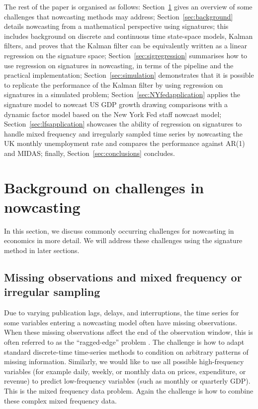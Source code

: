 \documentclass[a4paper, 12pt]{article}
\theoremstyle{remark}
\begin{document}
The rest of the paper is organised as follows: Section~\ref{sec:nowcasting_challenges} gives an overview of some challenges that nowcasting methods may address; Section~\ref{sec:background} details nowcasting from a mathematical perspective using signatures; this includes background on discrete and continuous time state-space models, Kalman filters, and proves that the Kalman filter can be equivalently written as a linear regression on the signature space; Section~\ref{sec:sigregression} summarises how to use regression on signatures in nowcasting, in terms of the pipeline and the practical implementation; Section~\ref{sec:simulation} demonstrates that it is possible to replicate the performance of the Kalman filter by using regression on signatures in a simulated problem; Section~\ref{sec:NYfedapplication} applies the signature model to nowcast US GDP growth drawing comparisons with a dynamic factor model based on the New York Fed staff nowcast model; Section~\ref{sec:lfsapplication} showcases the ability of regression on signatures to handle mixed frequency and irregularly sampled time series by nowcasting the UK monthly unemployment rate and compares the performance against AR(1) and MIDAS; finally, Section~\ref{sec:conclusions} concludes.  
\section{Background on challenges in nowcasting} \label{sec:nowcasting_challenges}

In this section, we discuss commonly occurring challenges for nowcasting in economics in more detail. We will address these challenges using the signature method in later sections.

\subsection{Missing observations and mixed frequency or irregular sampling} \label{subsec:irregular}
Due to varying publication lags, delays, and interruptions, the time series for some variables entering a nowcasting model often have missing observations. When these missing observations affect the end of the observation window, this is often referred to as the ``ragged-edge'' problem \citep{wallis1986forecasting}. The challenge is how to adapt standard discrete-time time-series methods to condition on arbitrary patterns of missing information. Similarly, we would like to use all possible high-frequency variables (for example daily, weekly, or monthly data on prices, expenditure, or revenue) to predict low-frequency variables (such as monthly or quarterly GDP). This is the mixed frequency data problem. Again the challenge is how to combine these complex mixed frequency data.
\end{document}
